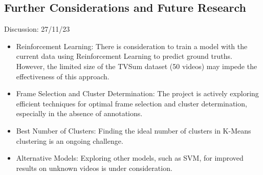 \documentclass[conference]{IEEEtran}
\begin{document}
\subsection*{Further Considerations and Future Research}
Discussion: 27/11/23
\begin{itemize}
    \item Reinforcement Learning: There is consideration to train a model with the current data using Reinforcement Learning to predict ground truths. However, the limited size of the TVSum dataset (50 videos) may impede the effectiveness of this approach.
    \item Frame Selection and Cluster Determination: The project is actively exploring efficient techniques for optimal frame selection and cluster determination, especially in the absence of annotations.
    \item Best Number of Clusters: Finding the ideal number of clusters in K-Means clustering is an ongoing challenge.
    \item Alternative Models: Exploring other models, such as SVM, for improved results on unknown videos is under consideration.
\end{itemize}
\end{document}

